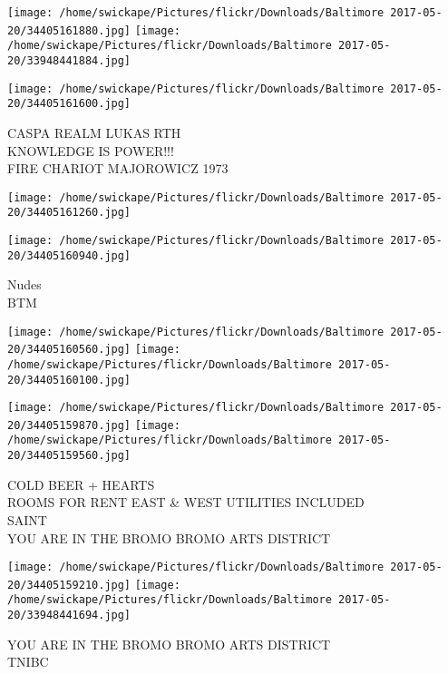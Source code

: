 \documentclass[10pt,letterpaper]{article}
\begin{document}
\texttt{[image: /home/swickape/Pictures/flickr/Downloads/Baltimore 2017-05-20/34405161880.jpg]}
\texttt{[image: /home/swickape/Pictures/flickr/Downloads/Baltimore 2017-05-20/33948441884.jpg]}

\vspace{0.25in}
\texttt{[image: /home/swickape/Pictures/flickr/Downloads/Baltimore 2017-05-20/34405161600.jpg]}

CASPA REALM LUKAS RTH\\
KNOWLEDGE IS POWER!!!\\
FIRE CHARIOT MAJOROWICZ 1973\\
\pagebreak

\texttt{[image: /home/swickape/Pictures/flickr/Downloads/Baltimore 2017-05-20/34405161260.jpg]}

\vspace{0.25in}
\texttt{[image: /home/swickape/Pictures/flickr/Downloads/Baltimore 2017-05-20/34405160940.jpg]}

Nudes\\
BTM\\
\pagebreak

\texttt{[image: /home/swickape/Pictures/flickr/Downloads/Baltimore 2017-05-20/34405160560.jpg]}
\texttt{[image: /home/swickape/Pictures/flickr/Downloads/Baltimore 2017-05-20/34405160100.jpg]}

\texttt{[image: /home/swickape/Pictures/flickr/Downloads/Baltimore 2017-05-20/34405159870.jpg]}
\texttt{[image: /home/swickape/Pictures/flickr/Downloads/Baltimore 2017-05-20/34405159560.jpg]}

COLD BEER + HEARTS\\
ROOMS FOR RENT EAST \& WEST UTILITIES INCLUDED\\
SAINT\\
YOU ARE IN THE BROMO BROMO ARTS DISTRICT\\
\pagebreak

\texttt{[image: /home/swickape/Pictures/flickr/Downloads/Baltimore 2017-05-20/34405159210.jpg]}
\texttt{[image: /home/swickape/Pictures/flickr/Downloads/Baltimore 2017-05-20/33948441694.jpg]}

YOU ARE IN THE BROMO BROMO ARTS DISTRICT\\
TNIBC\\
\pagebreak
\end{document}

